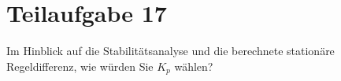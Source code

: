 \section{Teilaufgabe 17}
\begin{aufgabe}
    Im Hinblick auf die Stabilitätsanalyse und die berechnete stationäre 
    Regeldifferenz, wie würden Sie $K_p$ wählen?
\end{aufgabe}

